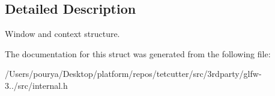 

\subsection{Detailed Description}
Window and context structure. 

The documentation for this struct was generated from the following file\+:\begin{DoxyCompactItemize}
\item 
/\+Users/pourya/\+Desktop/platform/repos/tetcutter/src/3rdparty/glfw-\/3../src/internal.\+h\end{DoxyCompactItemize}
